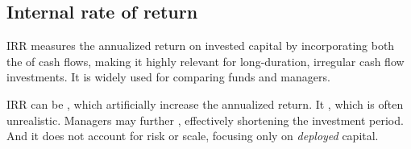 \subsection{Internal rate of return}

IRR measures the annualized return on invested capital by incorporating both the
 of cash flows, making it highly relevant for
long-duration, irregular cash flow investments. It is widely used for comparing
funds and managers.

\begin{imtrapbox}[breakable=false,title={Four ways IRR misleads}]
IRR can be , which artificially increase
the annualized return. It , which is
often unrealistic. Managers may further , effectively shortening the investment period. And it
does not account for risk or scale, focusing only on \emph{deployed} capital.
\end{imtrapbox}

\gapbadge
{}

